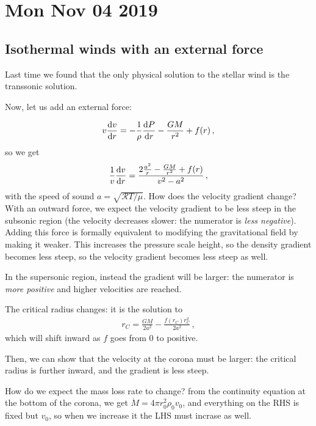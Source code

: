 \documentclass[main.tex]{subfiles}
\begin{document}
\section*{Mon Nov 04 2019}


\subsection{Isothermal winds with an external force}

Last time we found that the only physical solution to the stellar wind is the transsonic solution.

Now, let us add an external force:

%
\begin{align}
  v \dv{v}{r} = - \frac{1}{\rho } \dv{P}{r} - \frac{GM}{r^2} + f(r)
\,,
\end{align}
%
so we get 
%
\begin{align}
  \frac{1}{v} \dv{v}{r} = \frac{2 \frac{a^2}{r} - \frac{GM}{r^2} + f(r)}{v^2 - a^2}
\,,
\end{align}
%
with the speed of sound \(a = \sqrt{\mathcal{R} T / \mu } \). How does the velocity gradient change?
With an outward force, we expect the velocity gradient to be less steep in the subsonic region (the velocity decreases slower: the numerator is \emph{less negative}).
Adding this force is formally equivalent to modifying the gravitational field by making it weaker. This increases the pressure scale height, so the density gradient becomes less steep, so the velocity gradient becomes less steep as well.

In the supersonic region, instead the gradient will be larger: the numerator is \emph{more positive} and higher velocities are reached.

The critical radius changes: it is the solution to 
%
\begin{align}
  r_C = \frac{GM}{2 a^2} - \frac{f(r_C) r_C^2}{2 a^2}
\,,
\end{align}
%
which will shift inward as \(f\) goes from 0 to positive.

Then, we can show that the velocity at the corona must be larger: the critical radius is further inward, and the gradient is less steep.

How do we expect the mass loss rate to change? from the continuity equation at the bottom of the corona, we get \(\dot{M} = 4 \pi r_0^2 \rho_0 v_0 \), and everything on the RHS is fixed but \(v_0 \), so when we increase it the LHS must incrase as well.
\end{document}
